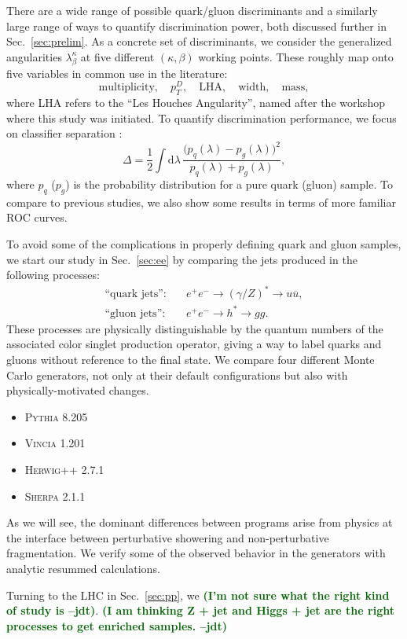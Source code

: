 \documentclass[11pt,letterpaper]{article}
\newcommand{\df}{\text{d}}
\DeclareRobustCommand{\Sec}[1]{Sec.~\ref{#1}}
\newcommand{\be}{\begin{equation}}
\newcommand{\ee}{\end{equation}}
\newcommand{\jdt}[1]{\textbf{\textcolor{darkgreen}{(#1 --jdt)}}}
\begin{document}
There are a wide range of possible quark/gluon discriminants and a similarly large range of ways to quantify discrimination power, both discussed further in  \Sec{sec:prelim}.  As a concrete set of discriminants, we consider the generalized angularities $\lambda_\beta^\kappa$ \cite{} at five different $(\kappa, \beta)$ working points.  These roughly map onto five variables in common use in the literature:
\be
\text{multiplicity}, \quad p_T^D, \quad \text{LHA}, \quad \text{width}, \quad \text{mass},
\ee
where LHA refers to the ``Les Houches Angularity'', named after the workshop where this study was initiated.  To quantify discrimination performance, we focus on classifier separation \cite{}:
\be
\Delta =  \frac{1}{2} \int \df \lambda \, \frac{\bigl(p_q(\lambda) - p_g(\lambda)\bigr)^2}{p_q(\lambda) + p_g(\lambda)},
\ee
where $p_q$ ($p_g$) is the probability distribution for a pure quark (gluon) sample.   To compare to previous studies, we also show some results in terms of more familiar ROC curves.

To avoid some of the complications in properly defining quark and gluon samples, we start our study in \Sec{sec:ee} by comparing the jets produced in the following processes:
\begin{align}
\text{``quark jets''}: \quad & e^+e^- \to (\gamma/Z)^* \to u \overline{u}, \\
\text{``gluon jets''}: \quad & e^+e^- \to h^* \to g g.
\end{align}
These processes are physically distinguishable by the quantum numbers of the associated color singlet production operator, giving a way to label quarks and gluons without reference to the final state.  We compare four different Monte Carlo generators, not only at their default configurations but also with physically-motivated changes.
\begin{itemize}
\item \textsc{Pythia 8.205} \cite{}
\item \textsc{Vincia 1.201} \cite{}
\item \textsc{Herwig++ 2.7.1} \cite{}
\item \textsc{Sherpa 2.1.1} \cite{}
\end{itemize}
As we will see, the dominant differences between programs arise from physics at the interface between perturbative showering and non-perturbative fragmentation.  We verify some of the observed behavior in the generators with analytic resummed calculations.

Turning to the LHC in \Sec{sec:pp}, we  \jdt{I'm not sure what the right kind of study is}.  \jdt{I am thinking Z + jet and Higgs + jet are the right processes to get enriched samples.}
\end{document}
